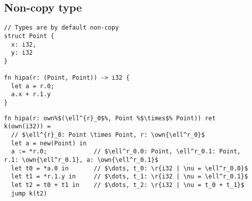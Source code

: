 \documentclass{article}
\newcommand{\own}[1]{\mathbf{own}\left(#1\right)}
\begin{document}
\clearpage
\subsection{Non-copy type}
\begin{verbatim}
// Types are by default non-copy
struct Point {
  x: i32,
  y: i32
}

fn hipa(r: (Point, Point)) -> i32 {
  let a = r.0;
  a.x + r.1.y
}
\end{verbatim}

\begin{verbatim}
fn hipa(r: own%$(\ell^{r}_0$%, Point %$\times$% Point)) ret k(own(i32)) =
  // $\ell^{r}_0: Point \times Point, r: \own{\ell^r_0}$
  let a = new(Point) in
  a := *r.0;             // $\ell^r_0.0: Point, \ell^r_0.1: Point, r.1: \own{\ell^r_0.1}, a: \own{\ell^r_0.1}$
  let t0 = *a.0 in       // $\dots, t_0: \r{i32 | \nu = \ell^r_0.0}$
  let t1 = *r.1.y in     // $\dots, t_1: \r{i32 | \nu = \ell^r_0.1}$
  let t2 = t0 + t1 in    // $\dots, t_2: \r{i32 | \nu = t_0 + t_1}$
  jump k(t2)
\end{verbatim}
\end{document}

